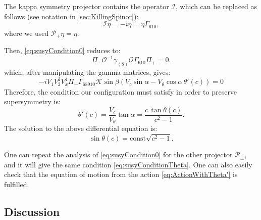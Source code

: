 The kappa symmetry projector contains the operator $\mathcal{I}$, which can be replaced as follows (see notation in \ref{sec:KillingSpinor}):
\begin{equation}
 \mathcal{I}\eta =-i \eta =\eta  \Gamma_{610},
\end{equation}
where we used $\mathcal{P}_+ \eta =\eta$. 

Then, \eqref{eq:susyCondition0} reduces to:
\begin{equation}
 \Pi_{-} \mathcal{O}^{-1} \gamma_{(8)} \mathcal{O} \Gamma_{610} \Pi_{+}  = 0.
\end{equation}
which, after manipulating the gamma matrices, gives:
\begin{equation}
-i V_1 V_2^2 V_x^4 \Pi_+ \Gamma_{6 8 9 10} \mathcal{K} \sin\beta \left(V_c \sin\alpha - V_\theta \cos\alpha \, \theta'(c)\right) = 0
\end{equation}
Therefore, the condition our configuration must satisfy in order to preserve supersymmetry is:
\begin{equation}\label{eq:susyConditionTheta}
 \theta'(c) = \dfrac{V_c}{V_\theta} \tan\alpha = \dfrac{c \, \tan\theta(c)}{c^2-1} .
\end{equation}
The solution to the above differential equation is:
\begin{equation}\label{eq:susyConditionSolution}
\boxed{\sin\theta(c) = \text{const} \sqrt{c^2-1}}.
\end{equation}

One can repeat the analysis of \eqref{eq:susyCondition0} for the other projector $\mathcal{P}_{\pm}$, and it will give the same condition \eqref{eq:susyConditionTheta}.
One can also easily check that the equation of motion from the action \eqref{eq:ActionWithTheta'} is fulfilled.


\subsection{Discussion}
